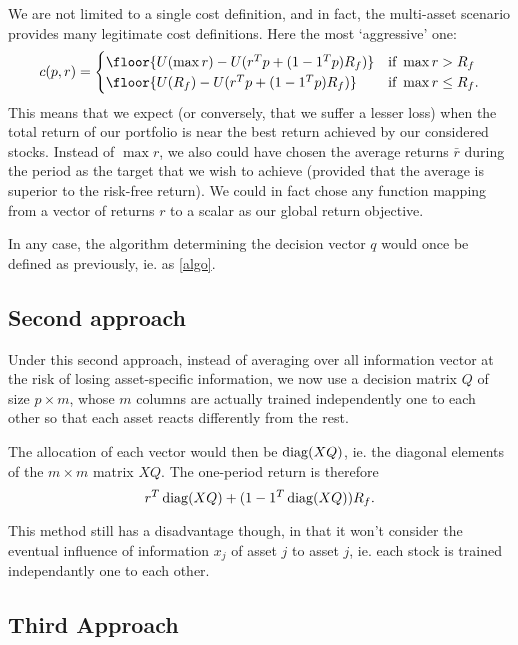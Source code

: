 We are not limited to a single cost definition, and in fact, the multi-asset scenario
provides many legitimate cost definitions. Here the most `aggressive' one:
\begin{equation}
  c(p,r) =
  \begin{cases}
    \floor{U(\max r) - U(r^{T}p + (1-1^{T}p)R_f)} & \text{if } \max r>R_f\\
    \floor{U(R_f) - U(r^{T}p + (1-1^{T}p)R_f)} &\text{if } \max r\leq R_f.
  \end{cases}  
\end{equation}
This means that we expect (or conversely, that we suffer a lesser loss) when the total
return of our portfolio is near the best return achieved by our considered stocks. Instead
of $\max r$, we also could have chosen the average returns $\bar r$ during the period as
the target that we wish to achieve (provided that the average is superior to the risk-free
return). We could in fact chose any function mapping from a vector of returns $r$ to a
scalar as our global return objective.

In any case, the algorithm determining the decision vector $q$ would once be defined as
previously, ie. as \eqref{algo}.


\subsection{Second approach}

Under this second approach, instead of averaging over all information vector at the risk
of losing asset-specific information, we now use a decision matrix $Q$ of size $p\times
m$, whose $m$ columns are actually trained independently one to each other so that each
asset reacts differently from the rest. 

The allocation of each vector would then be $\operatorname{diag}(XQ)$, ie. the diagonal elements of the
$m\times{}m$ matrix $XQ$. The one-period return is therefore
\begin{equation}
  r^{T}\operatorname{diag}(XQ) + (1 - 1^{T}\operatorname{diag}(XQ))R_f.
\end{equation}

This method still has a disadvantage though, in that it won't consider the eventual
influence of information $x_j$ of asset $j$ to asset $j$, ie. each stock is trained
independantly one to each other.

\subsection{Third Approach}

